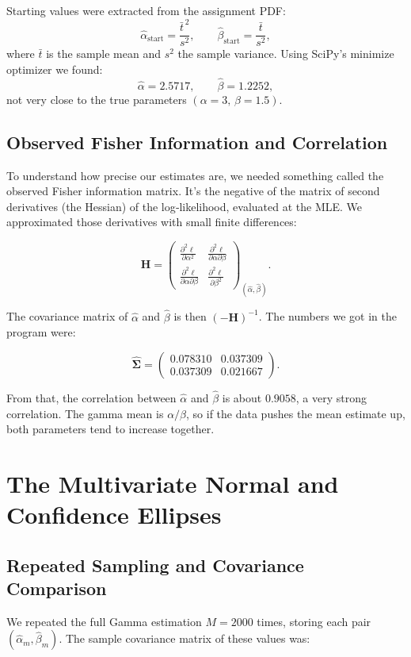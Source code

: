 \documentclass[11pt, letterpaper]{article}
\begin{document}
	Starting values were extracted from the assignment PDF:
	\[
	\hat{\alpha}_{\text{start}}=\frac{\bar{t}^{\,2}}{s^{2}},\qquad 
	\hat{\beta}_{\text{start}}=\frac{\bar{t}}{s^{2}},
	\]
	where \(\bar{t}\) is the sample mean and \(s^{2}\) the sample variance. Using SciPy's minimize optimizer we found:
	\[
	\hat{\alpha}=2.5717,\qquad \hat{\beta}=1.2252,
	\]
not very close to the true parameters \(({\alpha}=3,\,{\beta}=1.5)\).
	
	\subsection{Observed Fisher Information and Correlation}
	To understand how precise our estimates are, we needed something called the observed Fisher information matrix. It's the negative of the matrix of second derivatives (the Hessian) of the log‑likelihood, evaluated at the MLE. We approximated those derivatives with small finite differences:

	\[
	\mathbf{H}=\begin{pmatrix}
		\frac{\partial^2\ell}{\partial\alpha^2} & 	\frac{\partial^2\ell}{\partial\alpha\partial\beta}\\[4pt]
		\frac{\partial^2\ell}{\partial\alpha\partial\beta} & \frac{\partial^2\ell}{\partial\beta^2}
	\end{pmatrix}_{\!(\hat{\alpha},\hat{\beta})}.
	\]

	The covariance matrix of \(\hat{\alpha}\) and \(\hat{\beta}\) is then \((-\mathbf{H})^{-1}\). The numbers we got in the program were:

	\[
	\hat{\boldsymbol{\Sigma}}=\begin{pmatrix}
		0.078310 & 0.037309\\
		0.037309 & 0.021667
	\end{pmatrix}.
	\]

	From that, the correlation between \(\hat{\alpha}\) and \(\hat{\beta}\) is about \(0.9058\), a very strong correlation. The gamma mean is \(\alpha/\beta\), so if the data pushes the mean estimate up, both parameters tend to increase together. 
	
	\section{The Multivariate Normal and Confidence Ellipses}
	\subsection{Repeated Sampling and Covariance Comparison}
	We repeated the full Gamma estimation \(M=2000\) times, storing each pair \((\hat{\alpha}_m,\hat{\beta}_m)\). The sample covariance matrix of these values was:
	
\end{document}
